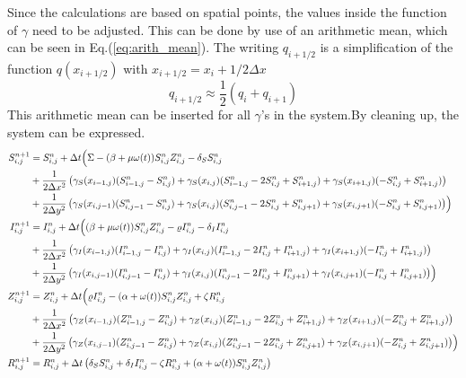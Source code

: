 \documentclass[%
twoside,                 %
final,                   %
10pt]{article}
\begin{document}
Since the calculations are based on spatial points, the values inside the function of $\gamma$ need to be adjusted. This can be done by use of an arithmetic mean, which can be seen in Eq.(\ref{eq:arith_mean}). The writing $q_{i+1/2}$ is a simplification of the function $q(x_{i+1/2})$ with $x_{i+1/2} = x_i + 1/2 \Delta x$
\begin{equation} \label{eq:arith_mean}
q_{i+1/2} \approx \frac{1}{2}(q_i +q_{i+1})
\end{equation}
This arithmetic mean can be inserted for all $\gamma$'s in the system.By cleaning up, the system can be expressed.
\begin{equation} \label{eq:SIZR_disc3}
	\begin{aligned}
    S^{n+1}_{i,j}   &= S^n_{i,j} + \Delta t \Bigl( \Sigma - (\beta+\mu \omega(t))S^{n}_{i,j}Z^{n}_{i,j}- \delta_S S^{n}_{i,j} \\
                    &+ \frac{1}{2\Delta x^2}\left(\gamma_S(x_{i-1,j})(S^{n}_{i-1,j}-S^{n}_{i,j})+\gamma_S(x_{i,j})(S^{n}_{i-1,j}-2S^{n}_{i,j}+S^{n}_{i+1,j})+\gamma_S(x_{i+1,j})(-S^{n}_{i,j}+S^{n}_{i+1,j})\right) \\
                    &+ \frac{1}{2\Delta y^2}\left(\gamma_S(x_{i,j-1})(S^{n}_{i,j-1}-S^{n}_{i,j})+\gamma_S(x_{i,j})(S^{n}_{i,j-1}-2S^{n}_{i,j}+S^{n}_{i,j+1})+\gamma_S(x_{i,j+1})(-S^{n}_{i,j}+S^{n}_{i,j+1})\right)\Bigr)\\
    I^{n+1}_{i,j}   &= I^n_{i,j} + \Delta t \Bigl((\beta+\mu \omega(t))S^{n}_{i,j}Z^{n}_{i,j}-\varrho I^{n}_{i,j}- \delta_I I^{n}_{i,j} \\
                    &+ \frac{1}{2\Delta x^2}\left(\gamma_I(x_{i-1,j})(I^{n}_{i-1,j}-I^{n}_{i,j})+\gamma_I(x_{i,j})(I^{n}_{i-1,j}-2I^{n}_{i,j}+I^{n}_{i+1,j})+\gamma_I(x_{i+1,j})(-I^{n}_{i,j}+I^{n}_{i+1,j})\right) \\
                    &+ \frac{1}{2\Delta y^2}\left(\gamma_I(x_{i,j-1})(I^{n}_{i,j-1}-I^{n}_{i,j})+\gamma_I(x_{i,j})(I^{n}_{i,j-1}-2I^{n}_{i,j}+I^{n}_{i,j+1})+\gamma_I(x_{i,j+1})(-I^{n}_{i,j}+I^{n}_{i,j+1})\right)\Bigr)\\
    Z^{n+1}_{i,j}   &= Z^n_{i,j} +\Delta t \Bigl( \varrho I^{n}_{i,j}-(\alpha+\omega(t))S^{n}_{i,j}Z^{n}_{i,j}+ \zeta R^{n}_{i,j} \\
                    &+ \frac{1}{2\Delta x^2}\left(\gamma_Z(x_{i-1,j})(Z^{n}_{i-1,j}-Z^{n}_{i,j})+\gamma_Z(x_{i,j})(Z^{n}_{i-1,j}-2Z^{n}_{i,j}+Z^{n}_{i+1,j})+\gamma_Z(x_{i+1,j})(-Z^{n}_{i,j}+Z^{n}_{i+1,j})\right) \\
                    &+ \frac{1}{2\Delta y^2}\left(\gamma_Z(x_{i,j-1})(Z^{n}_{i,j-1}-Z^{n}_{i,j})+\gamma_Z(x_{i,j})(Z^{n}_{i,j-1}-2Z^{n}_{i,j}+Z^{n}_{i,j+1})+\gamma_Z(x_{i,j+1})(-Z^{n}_{i,j}+Z^{n}_{i,j+1})\right)\Bigr)\\
    R^{n+1}_{i,j}   &= R^n_{i,j} +\Delta t \left(\delta_S S^{n}_{i,j}+\delta_I I^{n}_{i,j}-\zeta R^{n}_{i,j}+(\alpha+\omega(t))S^{n}_{i,j}Z^{n}_{i,j}\right)
	\end{aligned}
\end{equation}
\end{document}
